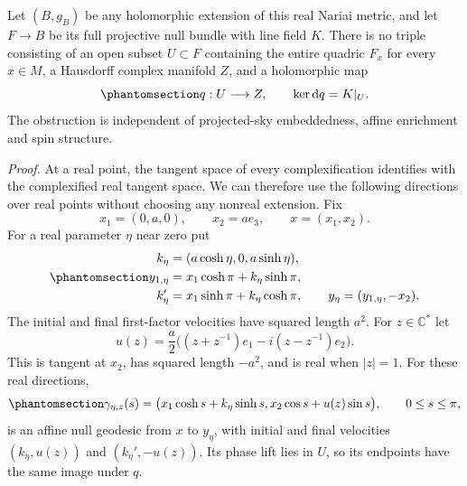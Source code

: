 \documentclass[
  english,
  11pt,
  reqno]{amsart}
\begin{document}
Let \((B,g_B)\) be any holomorphic extension of this real Nariai metric,
and let \(F\to B\) be its full projective null bundle with line field
\(K\). There is no triple consisting of an open subset \(U\subset F\)
containing the entire quadric \(F_x\) for every \(x\in M\), a Hausdorff
complex manifold \(Z\), and a holomorphic map
\begin{equation}\protect\phantomsection\label{eq:nariai-forbidden-carrier-map}{
q:U\longrightarrow Z,
\qquad\ker\mathrm dq=K|_U.
}\end{equation} The obstruction is independent of projected-sky
embeddedness, affine enrichment and spin structure.

\emph{Proof.} At a real point, the tangent space of every
complexification identifies with the complexified real tangent space. We
can therefore use the following directions over real points without
choosing any nonreal extension. Fix \[
x_1=(0,a,0),\qquad x_2=ae_3,\qquad x=(x_1,x_2).
\] For a real parameter \(\eta\) near zero put
\begin{equation}\protect\phantomsection\label{eq:nariai-endpoint-family}{
\begin{aligned}
k_\eta&=(a\cosh\eta,0,a\sinh\eta),\\
y_{1,\eta}&=x_1\cosh\pi+k_\eta\sinh\pi,\\
k_\eta'&=x_1\sinh\pi+k_\eta\cosh\pi,
\qquad y_\eta=(y_{1,\eta},-x_2).
\end{aligned}
}\end{equation} The initial and final first-factor velocities have
squared length \(a^2\). For \(z\in\mathbb C^*\) let \[
u(z)=\frac a2\bigl((z+z^{-1})e_1-i(z-z^{-1})e_2\bigr).
\] This is tangent at \(x_2\), has squared length \(-a^2\), and is real
when \(|z|=1\). For these real directions,
\begin{equation}\protect\phantomsection\label{eq:nariai-antipodal-null-geodesics}{
\gamma_{\eta,z}(s)=
\bigl(x_1\cosh s+k_\eta\sinh s,
      x_2\cos s+u(z)\sin s\bigr),
\qquad 0\le s\le\pi,
}\end{equation} is an affine null geodesic from \(x\) to \(y_\eta\),
with initial and final velocities \((k_\eta,u(z))\) and
\((k_\eta',-u(z))\). Its phase lift lies in \(U\), so its endpoints have
the same image under \(q\).
\end{document}
